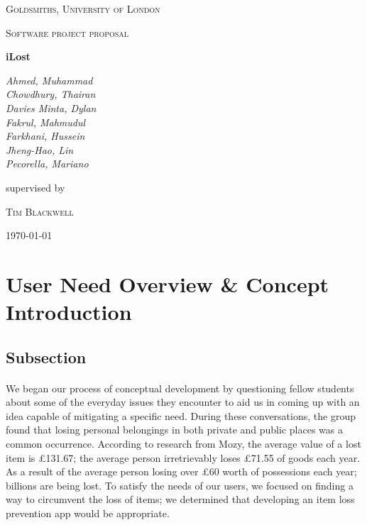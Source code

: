 \documentclass[12pt,a4paper]{article}
\begin{document}
    \begin{titlepage}
      \centering
      {\scshape\LARGE Goldsmiths, University of London \par}
      \vspace{1cm}
      {\scshape\Large Software project proposal\par}
      \vspace{1.5cm}
      {\huge\bfseries iLost\par}
      \vspace{2cm}
      {\Large\itshape 
        Ahmed, Muhammad\\
        Chowdhury, Thairan\\
        Davies Minta, Dylan\\     
        Fakrul, Mahmudul\\    
        Farkhani, Hussein\\ 
        Jheng-Hao, Lin\\
        Pecorella, Mariano\\ \par}
      \vfill
      supervised by\par
      \textsc{Tim Blackwell} 
      \vfill
      {\large \today \par}
    \end{titlepage}

    \tableofcontents
    \newpage
    

    \section{User Need Overview \& Concept Introduction}
      \subsection{Subsection}
        \paragraph{}
          We began our process of conceptual development by questioning fellow students about some of the everyday issues they encounter to aid us in coming up with an idea capable of mitigating a specific need. During these conversations, the group found that losing personal belongings in both private and public places was a common occurrence. According to research from Mozy, the average value of a lost item is £131.67; the average person irretrievably loses £71.55 of goods each year. As a result of the average person losing over £60 worth of possessions each year; billions are being lost.\cite{LostAndFound} To satisfy the needs of our users, we focused on finding a way to circumvent the loss of items; we determined that developing an item loss prevention app would be appropriate.
\end{document}
